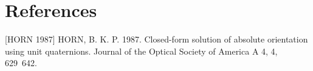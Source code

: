 \documentclass[11pt,a4paper]{article}
\begin{document}

\section*{References}

[HORN 1987] HORN, B. K. P. 1987. Closed-form solution of absolute orientation using unit quaternions. Journal of the Optical Society of America A 4, 4, 629~642.
\end{document}

